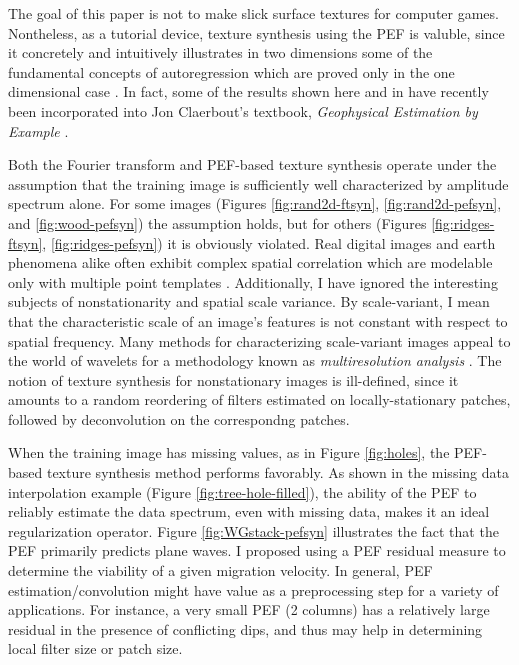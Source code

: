 	The goal of this paper is not to make slick surface textures for computer games.
	Nontheless, as a tutorial device, texture synthesis using the PEF is valuble, since
	it concretely and intuitively illustrates in two dimensions some of the fundamental 
	concepts of autoregression which are proved only in the one dimensional case 
	\cite[]{fgdp}.  In fact, some of the results shown here and in  
	\cite{claerbout-brown} have recently been incorporated into Jon Claerbout's 
	textbook, {\em Geophysical Estimation by Example} \cite[]{gee}.  

	\par
	Both the Fourier transform and PEF-based texture synthesis operate under the assumption
	that the training image is sufficiently well characterized by amplitude spectrum alone.
	For some images (Figures \ref{fig:rand2d-ftsyn}, \ref{fig:rand2d-pefsyn}, and 
	\ref{fig:wood-pefsyn}) the assumption holds, but for others (Figures \ref{fig:ridges-ftsyn},
	\ref{fig:ridges-pefsyn}) it is obviously violated.  Real digital images and earth
	phenomena alike often exhibit complex spatial correlation which are modelable only with
	multiple point templates  {\small \cite[]{caers-journel, malzbender-spach}}.  Additionally, 
	I have ignored the 
	interesting subjects of nonstationarity and spatial scale variance.  By scale-variant,
	I mean that the characteristic scale of an image's features is not constant with
	respect to spatial frequency.  Many methods for characterizing scale-variant images 
	appeal 
	to the world of wavelets for a methodology known as {\em multiresolution analysis}
	{\small \cite[]{simoncelli, heeger, strang}}.  The notion of texture synthesis for nonstationary
	images is ill-defined, since it amounts to a random reordering of filters estimated on
	locally-stationary patches, followed by deconvolution on the correspondng patches.

	\par
	When the training image has missing values, as in Figure \ref{fig:holes}, the PEF-based
	texture synthesis method performs favorably.  As shown in the missing data interpolation
	example (Figure \ref{fig:tree-hole-filled}), the ability of the PEF to reliably estimate
	the data spectrum, even with missing data, makes it an ideal regularization operator.
	Figure \ref{fig:WGstack-pefsyn} illustrates the fact that the PEF primarily predicts plane
	waves.  I proposed using a PEF residual measure to determine the viability of a given
	migration velocity.  In general, PEF estimation/convolution might have value as a 
	preprocessing step for a variety of applications.  For instance, a very small PEF
	(2 columns) has a relatively large residual in the presence of conflicting dips, and 
	thus may help in determining local filter size or patch size. 

